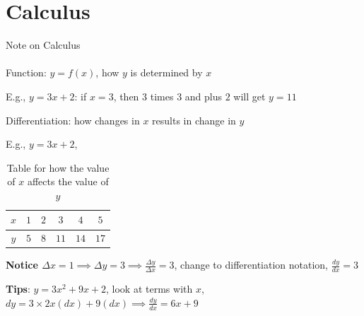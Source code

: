 \documentclass[11pt,aspectratio=169,usenames,dvipsnames]{beamer}
\let\tempone\itemize
\let\temptwo\enditemize
\renewenvironment{itemize}{\tempone\addtolength{\itemsep}{\fill}}{\temptwo}
\begin{document}
\appendix

% 
% 


\section{Calculus}
\label{sec:Calculus}



\begin{frame}{Note on Calculus}
\label{slide:Note_on_Calculus}
\framesubtitle{}
    \begin{itemize}
	\item Function: $y = f\left( x \right) $, how $ y $ is determined by $ x $
	    \begin{itemize}
	        \item E.g.,  $y = 3x+2$: if $x=3$, then $3$ times  $3$ and plus $2$ will get $y=11$
	    \end{itemize}
	\item Differentiation: how changes in $ x $ results in change in $y$
	    \begin{itemize}
	        \item E.g., $y = 3x+2$,
		    \begin{table}[htpb]
		        \centering
		        \caption{Table for how the value of $x$ affects the value of $y$}
		        \label{tab:Table-for-how-the-value-of-x-affects-the-value-of-y-}
		        \begin{tabular}{cccccc}
			    $x$ & $1$ &  $2$ &  $3$ & $4$ & $5$ \\
			    \hline
			    $y$ & $5$ & $8$ & $11$ & $14$ & $17$ \\
		        \end{tabular}
		    \end{table}
		    \textbf{Notice $ \Delta x = 1 \implies  \Delta y = 3  \implies  \frac{ \Delta y}{ \Delta x} = 3 $}, change to differentiation notation, $\frac{dy}{dx}  = 3$
	    \end{itemize}
	\item  \textbf{Tips}: $y = 3x^{2} + 9x  + 2 $, look at terms with $x$,  $dy = 3 \times 2 x\left( dx \right) + 9 \left( dx \right)   \implies \frac{dy}{dx} = 6x+9  $
    \end{itemize}
\end{frame}
\end{document}
